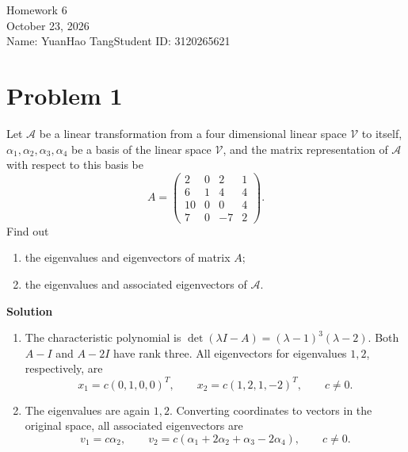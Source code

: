 \documentclass[UTF8,10pt,letterpaper,fontset=fandol]{ctexart}
\newcommand{\Solution}{\par\Needspace{4\baselineskip}\textbf{Solution}\par}
\begin{document}
\begin{center}
{\LARGE Homework 6}\\[0.6em]
October 23, 2026\\[0.25em]
Name: YuanHao Tang\quad Student ID: 3120265621
\end{center}

\section{Problem 1}
Let $\mathcal A$ be a linear transformation from a four dimensional linear space $\mathcal V$ to itself,
$\alpha_1,\alpha_2,\alpha_3,\alpha_4$ be a basis of the linear space $\mathcal V$, and the matrix representation of $\mathcal A$ with respect to this basis be
\[
A=\begin{pmatrix}2&0&2&1\\6&1&4&4\\10&0&0&4\\7&0&-7&2\end{pmatrix}.
\]
Find out
\begin{enumerate}
\item the eigenvalues and eigenvectors of matrix $A$;
\item the eigenvalues and associated eigenvectors of $\mathcal A$.
\end{enumerate}
\Solution
\begin{enumerate}
\item The characteristic polynomial is $\det(\lambda I-A)=(\lambda-1)^3(\lambda-2)$.
Both $A-I$ and $A-2I$ have rank three. All eigenvectors for eigenvalues $1,2$, respectively, are
\[
\boxed{x_1=c(0,1,0,0)^T,\qquad x_2=c(1,2,1,-2)^T,\qquad c\ne0.}
\]
\item The eigenvalues are again $1,2$. Converting coordinates to vectors in the original space, all associated eigenvectors are
\[
\boxed{v_1=c\alpha_2,\qquad v_2=c(\alpha_1+2\alpha_2+\alpha_3-2\alpha_4),\qquad c\ne0.}
\]
\end{enumerate}
\end{document}
